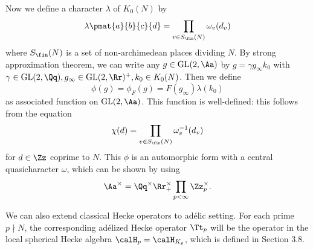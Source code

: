 \documentclass{article}
\newcommand{\GL}{\mathrm{GL}}
\begin{document}
Now we define a character $\lambda$ of $K_{0}(N)$ by 
$$
\lambda\pmat{a}{b}{c}{d} = \prod_{v\in S_{\fin}(N)} \omega_{v}(d_{v})
$$
where $S_{\fin}(N)$ is a set of non-archimedean places dividing $N$. By strong approximation theorem, we can write any $g\in \GL(2, \Aa)$ by $g = \gamma g_{\infty} k_0$ with $\gamma \in \GL(2, \Qq), g_{\infty} \in \GL(2, \Rr)^{+}, k_{0}\in K_{0}(N)$. 
Then we define 
$$
\phi(g) = \phi_{F}(g) = F(g_{\infty}) \lambda(k_{0})
$$
as associated function on $\GL(2, \Aa)$. This function is well-defined: this follows from the equation
$$
\chi(d) = \prod_{v\in S_{\fin}(N)} \omega_{v}^{-1}(d_{v})
$$
for $d\in \Zz$ coprime to $N$. This $\phi$ is an automorphic form with a central quasicharacter $\omega$, which can be shown by using 
$$
\Aa^{\times}= \Qq^{\times} \Rr_{+}^{\times} \prod_{p<\infty} \Zz_{p}^{\times}. 
$$

We can also extend classical Hecke operators to ad\'elic setting. For each prime $p\nmid N$, the corresponding ad\'elized Hecke operator $\Tt_{p}$ will be the operator in the local spherical Hecke algebra $\calH_{p}=\calH_{K_p}$, which is defined in Section 3.8. 
 
\end{document}
